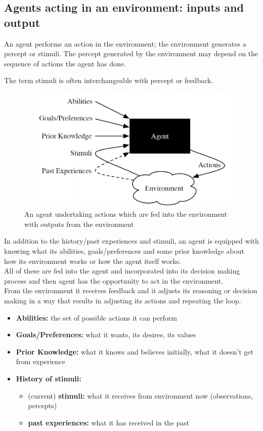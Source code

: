 \documentclass[12pt]{article}
\begin{document}
\newpage
\subsection*{Agents acting in an environment: inputs and output}
An agent performs an action in the environment; the environment generates a percept or stimuli. The percept generated by the environment may depend on the sequence of actions the agent has done.

The term stimuli is often interchangeable with percept or feedback.

\begin{figure}[h!]
        \centering
        \includegraphics[scale=0.5]{agent-inputs-output.png}
        \caption{An agent undertaking actions which are fed into the environment with outputs from the environment}
        \label{fig:my_label}
\end{figure}

\noindent In addition to the history/past experiences and stimuli, an agent is equipped with knowing what its abilities, goals/preferences and some prior knowledge about how its environment works or how the agent itself works.\\
All of these are fed into the agent and incorporated into its decision making process and then agent has the opportunity to act in the environment.\\
From the environment it receives feedback and it adjusts its reasoning or decision making in a way that results in adjusting its actions and repeating the loop.

\begin{itemize}
    \item \textbf{Abilities:} the set of possible actions it can perform
    \item \textbf{Goals/Preferences:} what it wants, its desires, its values
    \item \textbf{Prior Knowledge:} what it knows and believes initially, what it doesn't get from experience
    \item \textbf{History of stimuli:}
    \begin{itemize}
        \item (current) \textbf{stimuli:} what it receives from environment now (observations, percepts)
        \item \textbf{past experiences:} what it has received in the past
    \end{itemize}
\end{itemize}
\end{document}
